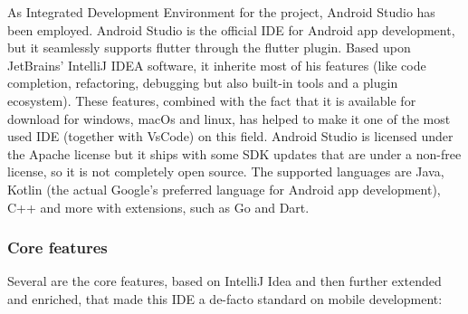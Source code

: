 As Integrated Development Environment for the project, Android Studio has been employed. Android Studio is the official IDE for Android app development, but it seamlessly supports flutter through the flutter plugin. Based upon JetBrains' IntelliJ IDEA software, it inherite most of his features (like code completion, refactoring, debugging but also built-in tools and a plugin ecosystem). These features, combined with the fact that it is available for download for windows, macOs and linux, has helped to make it one of the most used IDE (together with VsCode) on this field. Android Studio is licensed under the Apache license but it ships with some SDK updates that are under a non-free license, so it is not completely open source. The supported languages are Java, Kotlin (the actual Google's preferred language for Android app development), C++ and more with extensions, such as Go and Dart\cite{AndroidStudio}. 

\subsubsection{Core features}
Several are the core features, based on IntelliJ Idea and then further extended and enriched, that made this IDE a de-facto standard on mobile development:

